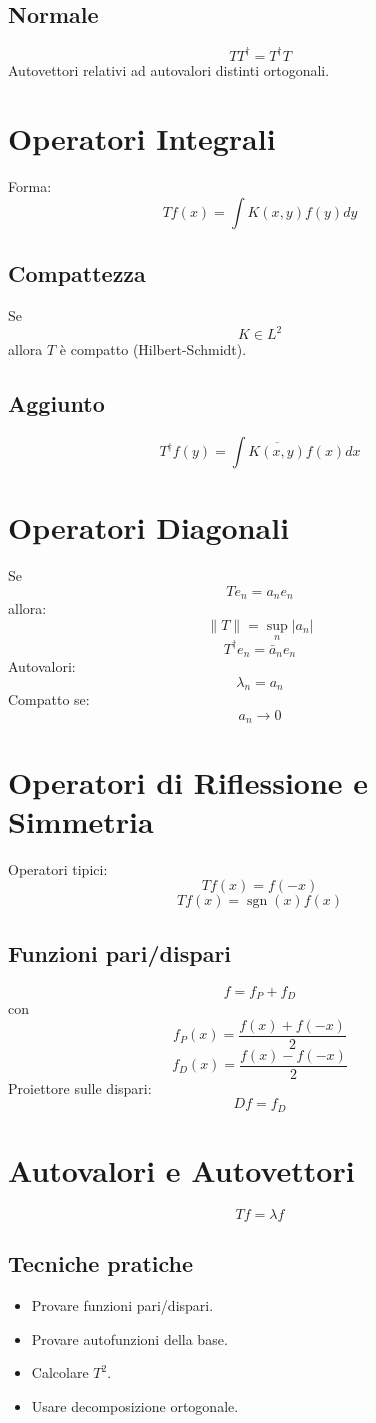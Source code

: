 \documentclass[a4paper,10pt]{article}
\begin{document}
\subsection{Normale}
\[TT^{\dagger}=T^{\dagger}T\]
Autovettori relativi ad autovalori distinti ortogonali.
\section{Operatori Integrali}
Forma:
\[Tf(x)=\int K(x,y)f(y)dy\]
\subsection{Compattezza}
Se
\[K\in L^2\]
allora $T$ è compatto (Hilbert-Schmidt).
\subsection{Aggiunto}
\[T^{\dagger}f(y)=\int \overline{K(x,y)}f(x)dx\]
\section{Operatori Diagonali}
Se
\[Te_n=a_ne_n\]
allora:
\[\|T\|=\sup_n|a_n|\]
\[T^{\dagger}e_n=\bar a_ne_n\]
Autovalori:
\[\lambda_n=a_n\]
Compatto se:
\[a_n\to0\]
\section{Operatori di Riflessione e Simmetria}
Operatori tipici:
\[Tf(x)=f(-x)\]
\[Tf(x)=\operatorname{sgn}(x)f(x)\]
\subsection{Funzioni pari/dispari}
\[f=f_P+f_D\]
con
\[f_P(x)=\frac{f(x)+f(-x)}2\]
\[f_D(x)=\frac{f(x)-f(-x)}2\]
Proiettore sulle dispari:
\[Df=f_D\]
\section{Autovalori e Autovettori}
\[Tf=\lambda f\]
\subsection{Tecniche pratiche}
\begin{itemize}
\item Provare funzioni pari/dispari.
\item Provare autofunzioni della base.
\item Calcolare $T^2$.
\item Usare decomposizione ortogonale.
\end{itemize}
\end{document}

